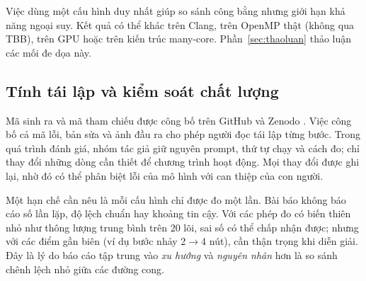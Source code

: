 Việc dùng một cấu hình duy nhất giúp so sánh công bằng nhưng giới hạn khả năng
ngoại suy. Kết quả có thể khác trên Clang, trên OpenMP thật (không qua TBB), trên
GPU hoặc trên kiến trúc many-core. Phần~\ref{sec:thaoluan} thảo luận các mối đe
dọa này.

\subsection{Tính tái lập và kiểm soát chất lượng}

Mã sinh ra và mã tham chiếu được công bố trên GitHub và Zenodo \cite{diehl2026}.
Việc công bố cả mã lỗi, bản sửa và ảnh đầu ra cho phép người đọc tái lập từng
bước. Trong quá trình đánh giá, nhóm tác giả giữ nguyên prompt, thứ tự chạy và
cách đo; chỉ thay đổi những dòng cần thiết để chương trình hoạt động. Mọi thay
đổi được ghi lại, nhờ đó có thể phân biệt lỗi của mô hình với can thiệp của con
người.

Một hạn chế cần nêu là mỗi cấu hình chỉ được đo một lần. Bài báo không báo cáo
số lần lặp, độ lệch chuẩn hay khoảng tin cậy. Với các phép đo có biến thiên nhỏ
như thông lượng trung bình trên 20 lõi, sai số có thể chấp nhận được; nhưng với
các điểm gần biên (ví dụ bước nhảy 2$\to$4 nút), cần thận trọng khi diễn giải.
Đây là lý do báo cáo tập trung vào \emph{xu hướng} và \emph{nguyên nhân} hơn là
so sánh chênh lệch nhỏ giữa các đường cong.

